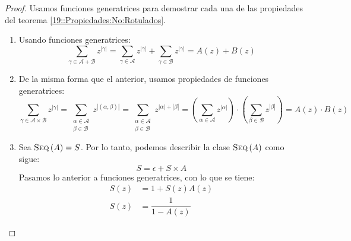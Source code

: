 \documentclass[english, spanish, fleqn, 10pt]{article}
\numberwithin{equation}{section}
\newcommand{\nparentesis}[1]{\left( #1 \right)}
\newcommand{\nabsoluto}[1]{\left| #1 \right|}
\theoremstyle{definition}
\DeclareMathOperator{\Seq}{\textsc{Seq}}
\begin{document}
\begin{proof}
	Usamos funciones generatrices para demostrar cada una de las propiedades del teorema \ref{19::Propiedades:No:Rotulados}.
	\begin{enumerate}
		\item Usando funciones generatrices:
		\begin{equation*}
		\sum_{\gamma \in \mathcal{A} + \mathcal{B}} z^{\nabsoluto{\gamma}} = \sum_{\gamma \in \mathcal{A}} z^{\nabsoluto{\gamma}} + \sum_{\gamma \in \mathcal{B}} z^{\nabsoluto{\gamma}} = A\nparentesis{z} + B\nparentesis{z}
		\end{equation*}
		
		\item De la misma forma que el anterior, usamos propiedades de funciones generatrices:
		\begin{equation*}
		\sum_{\gamma \in \mathcal{A} \times \mathcal{B}} z ^{\nabsoluto{\gamma}} = \sum_{\substack{\alpha \in \mathcal{A} \\ \beta \in \mathcal{B}}} z^{\nabsoluto{\nparentesis{\alpha, \beta}}} = \sum_{\substack{\alpha \in \mathcal{A} \\ \beta \in \mathcal{B}}}z^{\nabsoluto{\alpha} + \nabsoluto{\beta}} = \nparentesis{\sum_{\alpha \in \mathcal{A}} z^{\nabsoluto{\alpha}}} \cdot \nparentesis{\sum_{\beta \in \mathcal{B}} z^{\nabsoluto{\beta}}} = A\nparentesis{z} \cdot B \nparentesis{z}
		\end{equation*}
		
		\item Sea $\Seq \nparentesis{A} = S$. Por lo tanto, podemos describir la clase $\Seq \nparentesis{A}$ como sigue:
		\begin{equation*}
		S = \epsilon + S \times A
		\end{equation*}
		Pasamos lo anterior a funciones generatrices, con lo que se tiene:
		\begin{align*}
		S\nparentesis{z} &= 1 + S\nparentesis{z} A\nparentesis{z}\\
		S\nparentesis{z} &= \dfrac{1}{1 - A\nparentesis{z}}
		\end{align*}
		

\end{enumerate}
\end{proof}
\end{document}
